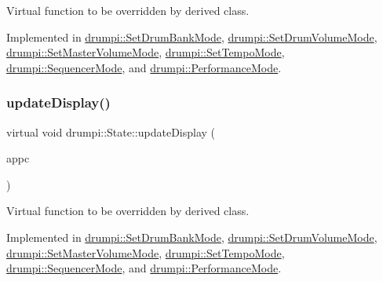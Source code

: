 Virtual function to be overridden by derived class. 

Implemented in \hyperlink{classdrumpi_1_1SetDrumBankMode_a9b63a16aa08551a743c3751fa385c83b}{drumpi\+::\+Set\+Drum\+Bank\+Mode}, \hyperlink{classdrumpi_1_1SetDrumVolumeMode_a6b0029ed8934700699658f3b85a67639}{drumpi\+::\+Set\+Drum\+Volume\+Mode}, \hyperlink{classdrumpi_1_1SetMasterVolumeMode_a18b5f4d0181ea1fbfd958afc473e240f}{drumpi\+::\+Set\+Master\+Volume\+Mode}, \hyperlink{classdrumpi_1_1SetTempoMode_a659f307caf23a57e3319ff6c510d41bf}{drumpi\+::\+Set\+Tempo\+Mode}, \hyperlink{classdrumpi_1_1SequencerMode_aaa5dea1ffd66792ba62afae00820ffc6}{drumpi\+::\+Sequencer\+Mode}, and \hyperlink{classdrumpi_1_1PerformanceMode_a37c7c2eed9185a2211e389eebfd60262}{drumpi\+::\+Performance\+Mode}.

\mbox{\label{classdrumpi_1_1State_a400c5fc605ddec1e4fe18c361bf38ef2}} 
\subsubsection{\texorpdfstring{update\+Display()}{updateDisplay()}}
{\footnotesize\ttfamily virtual void drumpi\+::\+State\+::update\+Display (\begin{DoxyParamCaption}\item[{\hyperlink{classdrumpi_1_1ApplicationCallback}{Application\+Callback} $\ast$}]{appc }\end{DoxyParamCaption})\hspace{0.3cm}{\ttfamily [pure virtual]}}

Virtual function to be overridden by derived class. 

Implemented in \hyperlink{classdrumpi_1_1SetDrumBankMode_ae2f14f230923c5e0c19c780c59328822}{drumpi\+::\+Set\+Drum\+Bank\+Mode}, \hyperlink{classdrumpi_1_1SetDrumVolumeMode_aee11645a25952da9cf8cbddf995f7b96}{drumpi\+::\+Set\+Drum\+Volume\+Mode}, \hyperlink{classdrumpi_1_1SetMasterVolumeMode_ad8637f24eb5a7c11d829b8d41a9c46f2}{drumpi\+::\+Set\+Master\+Volume\+Mode}, \hyperlink{classdrumpi_1_1SetTempoMode_a965294425ec5abfccd8e3cbb9f1dbc3d}{drumpi\+::\+Set\+Tempo\+Mode}, \hyperlink{classdrumpi_1_1SequencerMode_a0308bc9641daff4f48d74f9d2493d123}{drumpi\+::\+Sequencer\+Mode}, and \hyperlink{classdrumpi_1_1PerformanceMode_afc7bfd820bb21e4003ffe9ef189fa290}{drumpi\+::\+Performance\+Mode}.




